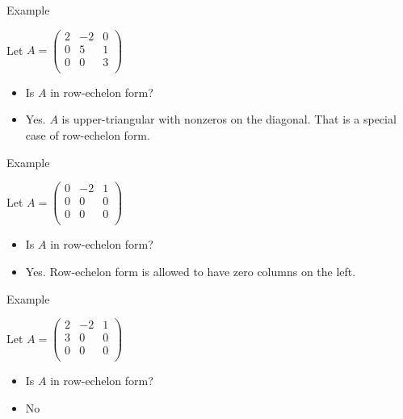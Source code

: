 \documentclass{beamer}
\begin{document}

\begin{frame}{Example}

Let
$
A=
\begin{pmatrix}
2 & -2 &  0 \\
0 & 5  &  1 \\
0 & 0  &  3 \\
\end{pmatrix}
$
\begin{itemize}
\item Is $A$ in row-echelon form?
\item Yes. $A$ is upper-triangular with nonzeros on the diagonal.
That is a special case of row-echelon form.
\end{itemize}

\end{frame}


\begin{frame}{Example}

Let
$
A=
\begin{pmatrix}
0 & -2  &   1 \\
0 &  0  &   0 \\
0 &  0  &   0 \\
\end{pmatrix}
$
\begin{itemize}
\item Is $A$ in row-echelon form?
\item Yes. Row-echelon form is allowed to have zero columns on the left.
\end{itemize}

\end{frame}


\begin{frame}{Example}

Let
$
A=
\begin{pmatrix}
2 & -2  &   1 \\
3 &  0  &   0 \\
0 &  0  &   0 \\
\end{pmatrix}
$
\begin{itemize}
\item Is $A$ in row-echelon form?
\item No
\end{itemize}

\end{frame}
\end{document}
